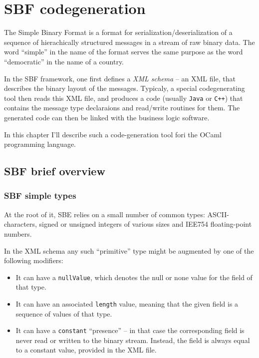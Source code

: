 \documentclass[twoside,a4paper]{refart}
\begin{document}
\section{SBF codegeneration}

The Simple Binary Format is a format for serialization/deserialization of a
sequence of hierachically structured messages in a stream of raw binary data.
The word ``simple'' in the name of the format serves the same purpose as the
word ``democratic'' in the name of a country.

In the SBF framework, one first defines a \textit{XML schema} -- an XML file,
that describes the binary layout of the messages.  Typicaly, a special
codegenerating tool then reads this XML file, and produces a code (usually
\texttt{Java} or \texttt{C++}) that contains the message type declaraions and
read/write routines for them. The generated code can then be linked with the
business logic software.  

In this chapter I'll describe such a code-generation tool fori the OCaml
programming language.
    
\subsection{SBF brief overview}

\subsubsection{SBF simple types}
At the root of it, SBE relies on a small number of common types:
ASCII-characters, signed or unsigned integers of various sizes and IEE754
floating-point numbers. 
    
In the XML schema any such ``primitive'' type might be augmented by one of the
following modifiers:
\begin{itemize}
    \item It can have a \texttt{nullValue}, which denotes the null or none
    value for the field of that type. 
    \item It can have an associated \texttt{length} value, meaning that the
    given field is a sequence of values of that type. 
    \item It can have a \texttt{constant}  ``presence'' -- in that case the
    corresponding field is never read or written to the binary
    stream.  Instead, the field is always equal to a constant value,
    provided in the XML file.
\end{itemize}
\end{document}
